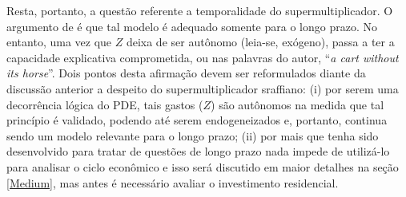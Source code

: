 Resta, portanto, a questão referente a temporalidade do supermultiplicador. O argumento de \citeauthor*{nikiforos_comments_2018} é que tal modelo é adequado somente para o longo prazo. No entanto, uma vez que $Z$ deixa de ser autônomo (leia-se, exógeno), passa a ter a capacidade explicativa comprometida, ou nas palavras do autor, ``\textit{a cart without its horse}''. 
Dois pontos desta afirmação devem ser reformulados diante da discussão anterior a despeito do supermultiplicador sraffiano: (i) por serem uma decorrência lógica do PDE, tais gastos ($Z$) são autônomos na medida que tal princípio é validado, podendo até serem endogeneizados e, portanto, continua sendo um modelo relevante para o longo prazo; (ii) por mais que tenha sido desenvolvido para tratar de questões de longo prazo nada impede de utilizá-lo para analisar o ciclo econômico e isso será discutido em maior detalhes na seção \ref{Medium}, mas antes é necessário avaliar o investimento residencial.

